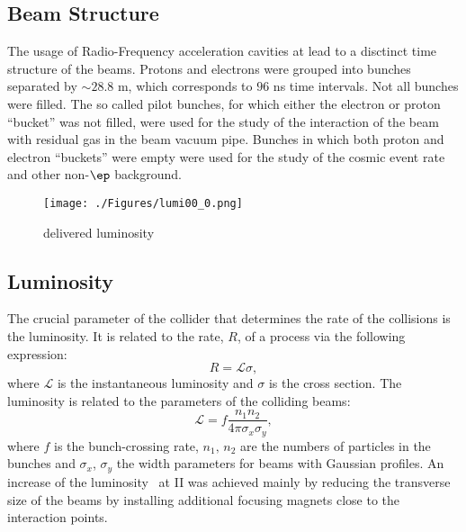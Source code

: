 \subsection{Beam Structure}
\label{subsec:beamstruct}
The usage of Radio-Frequency acceleration cavities at \hera lead to a disctinct time structure of the beams. Protons and electrons were grouped into bunches separated by $\sim 28.8$ m, which corresponds to $96$ ns time intervals. Not all bunches were filled. The so called pilot bunches, for which either the electron or proton ``bucket'' was not filled, were used for the study of the interaction of the beam with residual gas in the beam vacuum pipe. Bunches in which both proton and electron ``buckets'' were empty were used for the study of the cosmic event rate and other non-$\ep$ background.

\begin{figure}[t]
	\centering
		\texttt{[image: ./Figures/lumi00\_0.png]}
	\caption{\hera delivered luminosity}
	\label{fig:lumi00_0}
\end{figure}

\subsection{Luminosity}
\label{subsec:luminosity}
The crucial parameter of the collider that determines the rate of the collisions is the luminosity. It is related to the rate, $R$, of a process via the following expression:
\begin{equation}
	R = \mathcal{L}\sigma,
\end{equation}
where $\mathcal{L}$ is the instantaneous luminosity and $\sigma$ is the cross section. The luminosity is related to the parameters of the colliding beams:
\begin{equation}
	\mathcal{L} = f\frac{n_1n_2}{4\pi\sigma_x\sigma_y},
\end{equation}
where $f$ is the bunch-crossing rate, $n_1,\,n_2$ are the numbers of particles in the bunches and $\sigma_x$, $\sigma_y$ the width parameters for beams with Gaussian profiles. An increase of the luminosity~\cite{hera-98-05} at \hera II was achieved mainly by reducing the transverse size of the beams by installing additional focusing magnets close to the interaction points. 


